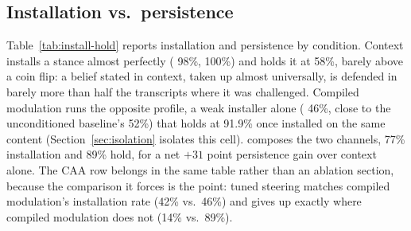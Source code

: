 \subsection{Installation vs.\ persistence}
\label{sec:dissociation-table}

Table~\ref{tab:install-hold} reports installation and persistence by condition. Context installs a
stance almost perfectly (\condB{} 98\%, \condD{} 100\%) and holds it at 58\%, barely
above a coin flip: a belief stated in context, taken up almost universally, is defended
in barely more than half the transcripts where it was challenged.
Compiled modulation
runs the opposite profile, a weak installer alone (\condC{} 46\%, close to the
unconditioned baseline's 52\%) that
holds at 91.9\% once installed on the same content\iflongversion{} (Section~\ref{sec:isolation}
isolates this cell)\fi. \condF{} composes the two channels, 77\% installation and 89\%
hold, for a net \(+31\) point persistence gain over context alone. The CAA row belongs
in the same table rather than an ablation section, because the comparison it forces is
the point: tuned steering matches compiled modulation's installation rate (42\% vs.\
46\%) and gives up exactly where compiled modulation does not (14\% vs.\
89\%).


